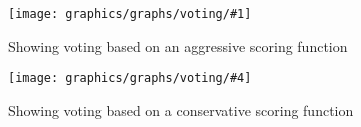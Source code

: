 \newcommand{\votinggraphs}[6]{
    \begin{figure}[h!]
    \begin{minipage}[t]{0.5\textwidth}
        \texttt{[image: graphics/graphs/voting/\#1]}
        \caption{#2}
        \label{#3}
    \end{minipage}
    \hspace*{\fill} %
    \begin{minipage}[t]{0.5\textwidth}
        \texttt{[image: graphics/graphs/voting/\#4]}
        \caption{#5}
        \label{#6}
    \end{minipage}
    \end{figure}
}

\newcommand{\easyvotinggraphs}[5]{ %
  \votinggraphs
  {voting-False_cover_rate_(FCR)-#1-Aggressive.pdf}{#2}{#3}
  {voting-False_cover_rate_(FCR)-#1-Conservative.pdf}{#4}{#5}
}


\easyvotinggraphs{Events_hit_rate_(EHR)}
{Showing voting based on an aggressive scoring function}{fig:voting_aggresive_ehr}
{Showing voting based on a conservative scoring function}{fig:voting_conservative_ehr}


